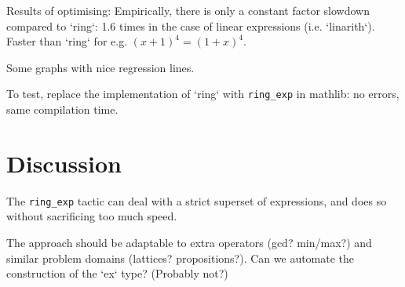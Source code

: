 \documentclass{llncs}
\newcommand{\lean}[1]{\texttt{#1}\xspace} %
\newcommand{\ringexp}{\lean{ring\_exp}}
\begin{document}
Results of optimising:
Empirically, there is only a constant factor slowdown compared to `ring`:
1.6 times in the case of linear expressions (i.e. `linarith`).
Faster than `ring` for e.g. $(x + 1)^4 = (1 + x)^4$.

Some graphs with nice regression lines.

To test, replace the implementation of `ring` with \ringexp in mathlib: no errors, same compilation time.

\section{Discussion}

The \ringexp tactic can deal with a strict superset of expressions,
and does so without sacrificing too much speed.

The approach should be adaptable to extra operators (gcd? min/max?) and similar problem domains (lattices? propositions?).
Can we automate the construction of the `ex` type? (Probably not?)

\printbibliography
\end{document}
